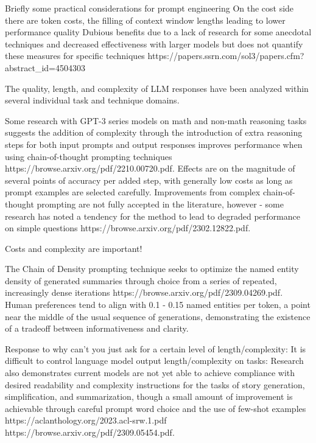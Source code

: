 \documentclass[11pt]{article}
\begin{document}
Briefly some practical considerations for prompt engineering 
On the cost side there are token costs, the filling of context window lengths leading to lower performance quality
Dubious benefits due to a lack of research for some anecdotal techniques and decreased effectiveness with larger models
but does not quantify these measures for specific techniques
https://papers.ssrn.com/sol3/papers.cfm?abstract_id=4504303

The quality, length, and complexity of LLM responses have been analyzed within several individual task and technique domains. 

Some research with GPT-3 series models on math and non-math reasoning tasks suggests the addition of complexity through the introduction of extra reasoning steps for both input prompts and output responses improves performance when using chain-of-thought prompting techniques https://browse.arxiv.org/pdf/2210.00720.pdf. Effects are on the magnitude of several points of accuracy per added step, with generally low costs as long as prompt examples are selected carefully. Improvements from complex chain-of-thought prompting are not fully accepted in the literature, however - some research has noted a tendency for the method to lead to degraded performance on simple questions https://browse.arxiv.org/pdf/2302.12822.pdf.

Costs and complexity are important!

The Chain of Density prompting technique seeks to optimize the named entity density of generated summaries through choice from a series of repeated, increasingly dense iterations https://browse.arxiv.org/pdf/2309.04269.pdf. Human preferences tend to align with 0.1 - 0.15 named entities per token, a point near the middle of the usual sequence of generations, demonstrating the existence of a tradeoff between informativeness and clarity.

Response to why can't you just ask for a certain level of length/complexity:
It is difficult to control language model output length/complexity on tasks:
Research also demonstrates current models are not yet able to achieve compliance with desired readability and complexity instructions for the tasks of story generation, simplification, and summarization, though a small amount of improvement is achievable through careful prompt word choice and the use of few-shot examples https://aclanthology.org/2023.acl-srw.1.pdf https://browse.arxiv.org/pdf/2309.05454.pdf.
\end{document}
